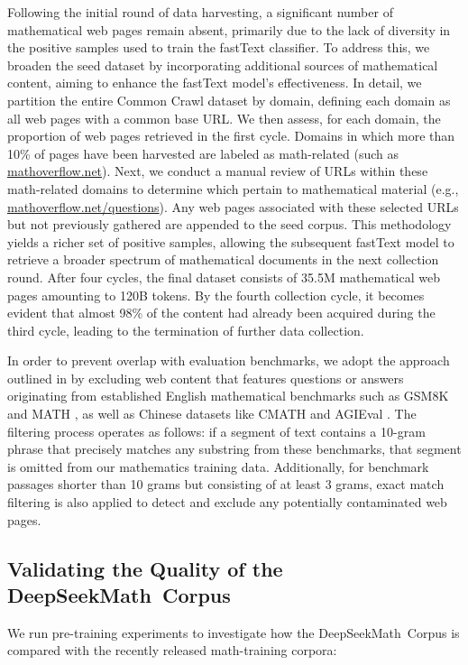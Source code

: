 \begin{itemize}[topsep=0pt]
Following the initial round of data harvesting, a significant number of mathematical web pages remain absent, primarily due to the lack of diversity in the positive samples used to train the fastText classifier. To address this, we broaden the seed dataset by incorporating additional sources of mathematical content, aiming to enhance the fastText model's effectiveness. In detail, we partition the entire Common Crawl dataset by domain, defining each domain as all web pages with a common base URL. We then assess, for each domain, the proportion of web pages retrieved in the first cycle. Domains in which more than 10\% of pages have been harvested are labeled as math-related (such as \url{mathoverflow.net}).
Next, we conduct a manual review of URLs within these math-related domains to determine which pertain to mathematical material (e.g., \url{mathoverflow.net/questions}).
Any web pages associated with these selected URLs but not previously gathered are appended to the seed corpus. This methodology yields a richer set of positive samples, allowing the subsequent fastText model to retrieve a broader spectrum of mathematical documents in the next collection round. After four cycles, the final dataset consists of 35.5M mathematical web pages amounting to 120B tokens. By the fourth collection cycle, it becomes evident that almost 98\% of the content had already been acquired during the third cycle, leading to the termination of further data collection.

In order to prevent overlap with evaluation benchmarks, we adopt the approach outlined in \cite{deepseek-coder} by excluding web content that features questions or answers originating from established English mathematical benchmarks such as GSM8K \citep{gsm8k} and MATH \citep{MATH}, as well as Chinese datasets like CMATH \citep{wei2023cmath} and AGIEval \citep{agieval}. The filtering process operates as follows: if a segment of text contains a 10-gram phrase that precisely matches any substring from these benchmarks, that segment is omitted from our mathematics training data. Additionally, for benchmark passages shorter than 10 grams but consisting of at least 3 grams, exact match filtering is also applied to detect and exclude any potentially contaminated web pages.

\subsection{Validating the Quality of the DeepSeekMath~Corpus}

We run pre-training experiments to investigate how the DeepSeekMath~Corpus is compared with the recently released math-training corpora:


\end{itemize}
